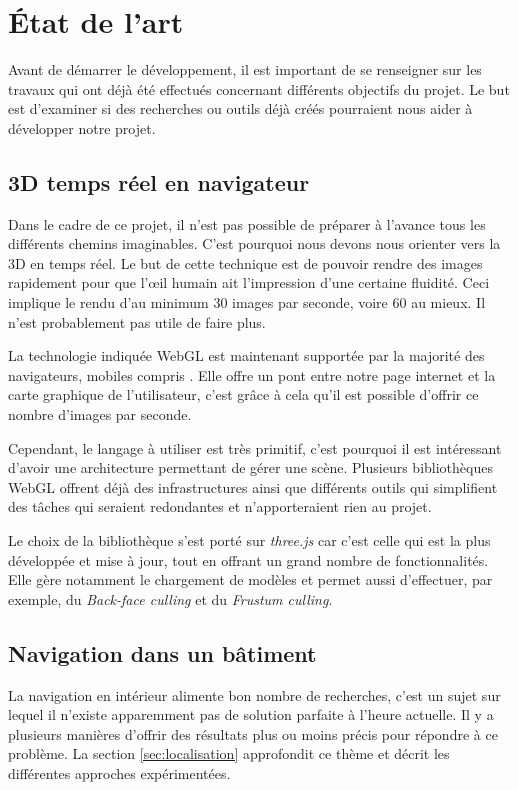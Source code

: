 \section{État de l'art}
Avant de démarrer le développement, il est important de se renseigner sur les travaux qui ont déjà été effectués concernant différents objectifs du projet. Le but est d'examiner si des recherches ou outils déjà créés pourraient nous aider à développer notre projet.


\subsection{3D temps réel en navigateur}
Dans le cadre de ce projet, il n'est pas possible de préparer à l'avance tous les différents chemins imaginables. C'est pourquoi nous devons nous orienter vers la 3D en temps réel. Le but de cette technique est de pouvoir rendre des images rapidement pour que l'œil humain ait l'impression d'une certaine fluidité. Ceci implique le rendu d'au minimum 30 images par seconde, voire 60 au mieux. Il n'est probablement pas utile de faire plus.

La technologie indiquée WebGL est maintenant supportée par la majorité des navigateurs, mobiles compris \cite{caniuse-webgl}. Elle offre un pont entre notre page internet et la carte graphique de l'utilisateur, c'est grâce à cela qu'il est possible d'offrir ce nombre d'images par seconde. 

Cependant, le langage à utiliser est très primitif, c'est pourquoi il est intéressant d'avoir une architecture permettant de gérer une scène. Plusieurs bibliothèques WebGL offrent déjà des infrastructures ainsi que différents outils qui simplifient des tâches qui seraient redondantes et n'apporteraient rien au projet.

Le choix de la bibliothèque s'est porté sur \emph{three.js}\cite{threejs-website} car c'est celle qui est la plus développée et mise à jour, tout en offrant un grand nombre de fonctionnalités. Elle gère notamment le chargement de modèles et permet aussi d'effectuer, par exemple, du \textit{Back-face culling} et du \textit{Frustum culling}\cite{wiki-HiddenSurfaceDetermination}.


\subsection{Navigation dans un bâtiment}
La navigation en intérieur alimente bon nombre de recherches, c'est un sujet sur lequel il n'existe apparemment pas de solution parfaite à l'heure actuelle. Il y a plusieurs manières d'offrir des résultats plus ou moins précis pour répondre à ce problème. La section \ref{sec:localisation} approfondit ce thème et décrit les différentes approches expérimentées.



